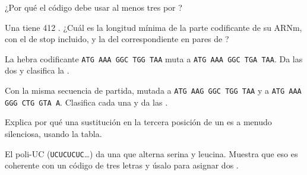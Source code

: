 \begin{exercise}[$\star$]\label{exo:g11:gene-expression:5}
¿Por qué el código debe usar al menos tres  por ?
\end{exercise}

\begin{exercise}[$\star\star$]\label{exo:g11:gene-expression:6}
Una  tiene 412 . ¿Cuál es la longitud mínima de la
parte codificante de su ARNm, con el  de stop incluido, y la del
 correspondiente en pares de ?
\end{exercise}

\begin{exercise}[$\star\star$]\label{exo:g11:gene-expression:7}
La hebra codificante \texttt{ATG AAA GGC TGG TAA} muta a
\texttt{ATG AAA GGC TGA TAA}. Da las dos  y clasifica la
.
\end{exercise}

\begin{exercise}[$\star\star$]\label{exo:g11:gene-expression:8}
Con la misma secuencia de partida, mutada a \texttt{ATG AAG GGC TGG TAA}
y a \texttt{ATG AAA GGG CTG GTA A}. Clasifica cada una y da las
.
\end{exercise}

\begin{exercise}[$\star\star$]\label{exo:g11:gene-expression:9}
Explica por qué una sustitución en la tercera posición de un  es a
menudo silenciosa, usando la tabla.
\end{exercise}

\begin{exercise}[$\star\star$]\label{exo:g11:gene-expression:10}
El  poli-UC (\texttt{UCUCUCUC}\dots) da una  que alterna
serina y leucina. Muestra que eso es coherente con un código de tres
letras y úsalo para asignar dos .
\end{exercise}

